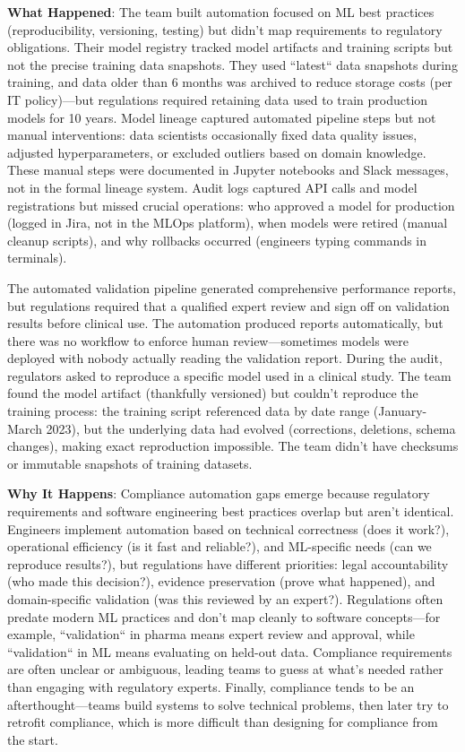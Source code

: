 \textbf{What Happened}: The team built automation focused on ML best practices (reproducibility, versioning, testing) but didn't map requirements to regulatory obligations. Their model registry tracked model artifacts and training scripts but not the precise training data snapshots. They used ``latest`` data snapshots during training, and data older than 6 months was archived to reduce storage costs (per IT policy)---but regulations required retaining data used to train production models for 10 years. Model lineage captured automated pipeline steps but not manual interventions: data scientists occasionally fixed data quality issues, adjusted hyperparameters, or excluded outliers based on domain knowledge. These manual steps were documented in Jupyter notebooks and Slack messages, not in the formal lineage system. Audit logs captured API calls and model registrations but missed crucial operations: who approved a model for production (logged in Jira, not in the MLOps platform), when models were retired (manual cleanup scripts), and why rollbacks occurred (engineers typing commands in terminals).

The automated validation pipeline generated comprehensive performance reports, but regulations required that a qualified expert review and sign off on validation results before clinical use. The automation produced reports automatically, but there was no workflow to enforce human review---sometimes models were deployed with nobody actually reading the validation report. During the audit, regulators asked to reproduce a specific model used in a clinical study. The team found the model artifact (thankfully versioned) but couldn't reproduce the training process: the training script referenced data by date range (January-March 2023), but the underlying data had evolved (corrections, deletions, schema changes), making exact reproduction impossible. The team didn't have checksums or immutable snapshots of training datasets.

\textbf{Why It Happens}: Compliance automation gaps emerge because regulatory requirements and software engineering best practices overlap but aren't identical. Engineers implement automation based on technical correctness (does it work?), operational efficiency (is it fast and reliable?), and ML-specific needs (can we reproduce results?), but regulations have different priorities: legal accountability (who made this decision?), evidence preservation (prove what happened), and domain-specific validation (was this reviewed by an expert?). Regulations often predate modern ML practices and don't map cleanly to software concepts---for example, ``validation`` in pharma means expert review and approval, while ``validation`` in ML means evaluating on held-out data. Compliance requirements are often unclear or ambiguous, leading teams to guess at what's needed rather than engaging with regulatory experts. Finally, compliance tends to be an afterthought---teams build systems to solve technical problems, then later try to retrofit compliance, which is more difficult than designing for compliance from the start.

